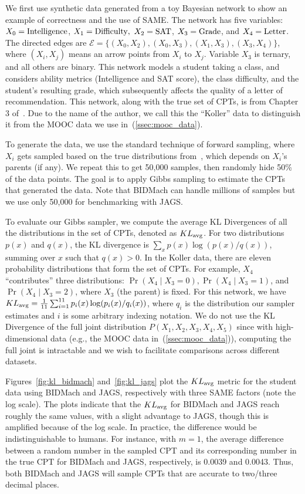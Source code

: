 \documentclass{article} %
\begin{document}
We first use synthetic data generated from a toy Bayesian network to show an example of correctness
and the use of SAME. The network has five variables: $X_0 = {\rm Intelligence}$, $X_1 =
{\rm Difficulty},$ $X_2 = {\rm SAT}$, $X_3 = {\rm Grade}$, and $X_4 = {\rm Letter}$. The directed
edges are $\mathcal{E} = \{(X_0, X_2), (X_0, X_3), (X_1,X_3), (X_3,X_4)\}$, where $(X_i,X_j)$ means
an arrow points from $X_i$ to $X_j$.  Variable $X_3$ is ternary, and all others are binary. This
network models a student taking a class, and considers ability metrics (Intelligence and SAT score),
the class difficulty, and the student's resulting grade, which subsequently affects the quality of a
letter of recommendation. This network, along with the true set of CPTs, is from Chapter 3
of~\citet{Koller2009}. Due to the name of the author, we call this the ``Koller'' data to
distinguish it from the MOOC data we use in~(\ref{ssec:mooc_data}).

To generate the data, we use the standard technique of forward sampling, where $X_i$ gets sampled
based on the true distributions from~\citet{Koller2009}, which depends on $X_i$'s parents (if any).
We repeat this to get 50,000 samples, then randomly hide 50\% of the data points. The goal is to
apply Gibbs sampling to estimate the CPTs that generated the data. Note that BIDMach can handle
millions of samples but we use only 50,000 for benchmarking with JAGS.

To evaluate our Gibbs sampler, we compute the average KL Divergences of all the distributions in the
set of CPTs, denoted as $KL_{\rm avg}$.  For two distributions $p(x)$ and $q(x)$, the KL divergence
is $\sum_x p(x) \log(p(x)/q(x))$, summing over $x$ such that $q(x) > 0$.  In the Koller data, there
are eleven probability distributions that form the set of CPTs. For example, $X_4$ ``contributes''
three distributions: $\Pr(X_4 \mid X_3 = 0), \Pr(X_4 \mid X_3 = 1)$, and $\Pr(X_4 \mid X_3 = 2)$,
where $X_3$ (the parent) is fixed. For this network, we have $KL_{\rm avg} = \frac{1}{11}
\sum_{i=1}^{11} p_i(x) \log(p_i(x)/q_i(x))$, where $q_i$ is the distribution our sampler estimates
and $i$ is some arbitrary indexing notation. We do not use the KL Divergence of the full joint
distribution $P(X_1,X_2,X_3,X_4,X_5)$ since with high-dimensional data (e.g., the MOOC data
in~(\ref{ssec:mooc_data})), computing the full joint is intractable and we wish to facilitate
comparisons across different datasets.

Figures~\ref{fig:kl_bidmach} and~\ref{fig:kl_jags} plot the $KL_{\rm avg}$ metric for the student
data using BIDMach and JAGS, respectively with three SAME factors (note the log scale). The plots
indicate that the $KL_{\rm avg}$ for BIDMach and JAGS reach roughly the same values, with a slight
advantage to JAGS, though this is amplified because of the log scale. In practice, the difference
would be indistinguishable to humans. For instance, with $m=1$, the average difference between a
random number in the sampled CPT and its corresponding number in the true CPT for BIDMach and JAGS,
respectively, is 0.0039 and 0.0043. Thus, both BIDMach and JAGS will sample CPTs that are accurate
to two/three decimal places.
\end{document}
